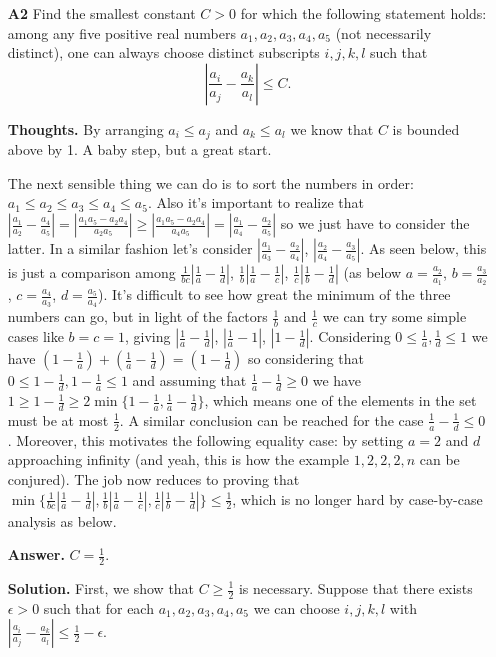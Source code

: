 \documentclass[11pt,a4paper]{article}
\begin{document}
\begin{itemize}
\newpage
\item[\textbf{A2}]
 Find the smallest constant $C > 0$ for which the following statement holds: among any five positive real numbers $a_1,a_2,a_3,a_4,a_5$ (not necessarily distinct), one can always choose distinct subscripts $i,j,k,l$ such that
\[ \left| \frac{a_i}{a_j} - \frac {a_k}{a_l} \right| \le C. \]

\textbf{Thoughts.} 
By arranging $a_i\le a_j$ and $a_k\le a_l$ we know that $C$ is bounded above by 1. A baby step, but a great start.

The next sensible thing we can do is to sort the numbers in order: 
$a_1\le a_2\le a_3\le a_4\le a_5$. 
Also it's important to realize that $|\frac{a_1}{a_2}-\frac{a_4}{a_5}|=|\frac{a_1a_5-a_2a_4}{a_2a_5}|\ge |\frac{a_1a_5-a_2a_4}{a_4a_5}|=|\frac{a_1}{a_4}-\frac{a_2}{a_5}|$ so we just have to consider the latter. 
In a similar fashion let's consider $|\frac{a_1}{a_3}-\frac{a_2}{a_4}|$, 
$|\frac{a_2}{a_4}-\frac{a_3}{a_5}|$. 
As seen below, this is just a comparison among 
$\frac 1{bc}|\frac 1a-\frac 1d|$, $\frac 1b|\frac 1a-\frac 1c|$, $\frac 1c|\frac 1b-\frac 1d|$ 
(as below  $a=\frac {a_2}{a_1}$, 
$b=\frac {a_3}{a_2}$, 
$c=\frac {a_4}{a_3}$, 
$d=\frac {a_5}{a_4}$). 
It's difficult to see how great the minimum of the three numbers can go, 
but in light of the factors $\frac 1b$ and $\frac 1c$ we can try some simple cases like $b=c=1$, 
giving $|\frac 1a-\frac 1d|$, $|\frac 1a-1|$, $|1-\frac 1d|$. 
Considering $0\le \frac 1a, \frac 1d\le 1$ we have 
$(1-\frac 1a)+(\frac 1a-\frac 1d)=(1-\frac 1d)$ 
so considering that $0\le 1-\frac 1d, 1-\frac 1a\le 1$ and assuming that $\frac 1a-\frac 1d\ge 0$ we have 
$1\ge 1-\frac 1d\ge 2\min\{1-\frac 1a, \frac 1a-\frac 1d\}$, which means one of the elements in the set must be at most $\frac 12$. 
A similar conclusion can be reached for the case $\frac 1a-\frac 1d\le 0$. 
Moreover, this motivates the following equality case: by setting $a=2$ and $d$ approaching infinity (and yeah, this is how the example $1, 2, 2, 2, n$ can be conjured). 
The job now reduces to proving that $\min \{\frac 1{bc}|\frac 1a-\frac 1d|, \frac 1b|\frac 1a-\frac 1c|, \frac 1c|\frac 1b-\frac 1d|\}\le \frac 12$, which is no longer hard by case-by-case analysis as below. 

\textbf{Answer.} $C=\frac 12$. 

\textbf{Solution.} 
First, we show that $C\ge\frac 12$ is necessary. 
Suppose that there exists $\epsilon >0$ such that for each $a_1,a_2,a_3,a_4,a_5$ we can choose $i, j, k, l$ with 
$\left| \frac{a_i}{a_j} - \frac {a_k}{a_l} \right| \le \frac 12-\epsilon $. 


\end{itemize}
\end{document}
